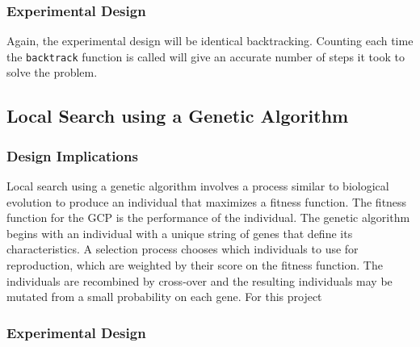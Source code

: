 \documentclass{article}
\begin{document}
\begin{multicols}{2}
\subsubsection{Experimental Design}
Again, the experimental design will be identical backtracking. Counting each time the \texttt{backtrack} function is called will give an accurate number of steps it took to solve the problem.

\subsection{Local Search using a Genetic Algorithm}
\subsubsection{Design Implications}
Local search using a genetic algorithm involves a process similar to biological evolution to produce an individual that maximizes a fitness function.  The fitness function for the GCP is the performance of the individual.  The genetic algorithm begins with an individual with a unique string of genes that define its characteristics.  A selection process chooses which individuals to use for reproduction, which are weighted by their score on the fitness function.  The individuals are recombined by cross-over and the resulting individuals may be mutated from a small probability on each gene. For this project 
\subsubsection{Experimental Design}

\end{multicols}

	
	
\end{document}

